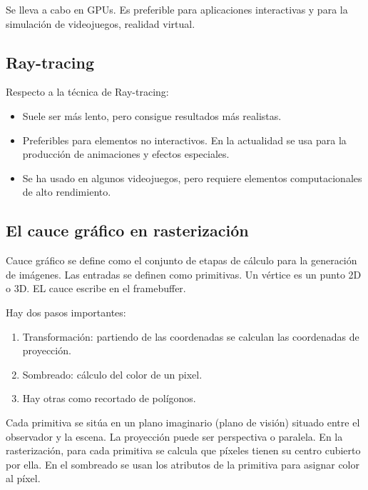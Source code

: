 \documentclass[12pt]{report} %
\providecommand{\tightlist}{%
  \setlength{\itemsep}{0pt}\setlength{\parskip}{0pt}}
\begin{document}
Se lleva a cabo en GPUs. Es preferible para aplicaciones interactivas y
para la simulación de videojuegos, realidad virtual.

\hypertarget{ray-tracing}{%
\subsection{Ray-tracing}\label{ray-tracing}}

Respecto a la técnica de Ray-tracing:

\begin{itemize}
\tightlist
\item
  Suele ser más lento, pero consigue resultados más realistas.\\
\item
  Preferibles para elementos no interactivos. En la actualidad se usa
  para la producción de animaciones y efectos especiales.\\
\item
  Se ha usado en algunos videojuegos, pero requiere elementos
  computacionales de alto rendimiento.
\end{itemize}

\hypertarget{el-cauce-gruxe1fico-en-rasterizaciuxf3n}{%
\subsection{El cauce gráfico en
rasterización}\label{el-cauce-gruxe1fico-en-rasterizaciuxf3n}}

Cauce gráfico se define como el conjunto de etapas de cálculo para la
generación de imágenes. Las entradas se definen como primitivas. Un
vértice es un punto 2D o 3D. EL cauce escribe en el framebuffer.

Hay dos pasos importantes:

\begin{enumerate}
\def\labelenumi{\arabic{enumi}.}
\tightlist
\item
  Transformación: partiendo de las coordenadas se calculan las
  coordenadas de proyección.\\
\item
  Sombreado: cálculo del color de un pixel.\\
\item
  Hay otras como recortado de polígonos.
\end{enumerate}

Cada primitiva se sitúa en un plano imaginario (plano de visión) situado
entre el observador y la escena. La proyección puede ser perspectiva o
paralela. En la rasterización, para cada primitiva se calcula que
píxeles tienen su centro cubierto por ella. En el sombreado se usan los
atributos de la primitiva para asignar color al píxel.
\end{document}

